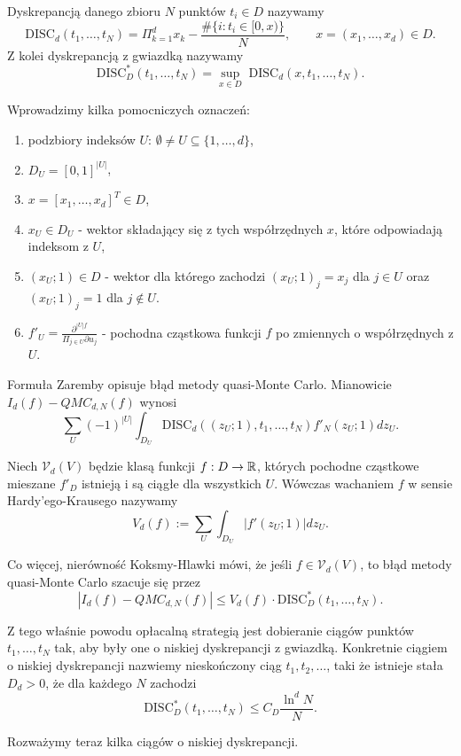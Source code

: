 \documentclass[a4paper,12pt]{article}
\begin{document}
Dyskrepancją danego zbioru $N$ punktów $t_i \in D$ nazywamy
$$
    \text{DISC}_{d}(t_1, \dots, t_N) = \Pi_{k=1}^{d} x_k - \frac{\#\{ i : t_i \in [0, x) \} }{N}, \qquad
    x = (x_1, \dots, x_d) \in D.
$$
Z kolei dyskrepancją z gwiazdką nazywamy
$$
    \text{DISC}^*_{D}(t_1, \dots, t_N) = \sup_{x \in D} \; \text{DISC}_{d}(x, t_1, \dots, t_N).
$$

Wprowadzimy kilka pomocniczych oznaczeń:
\begin{enumerate}
    \item podzbiory indeksów $U$: $\emptyset \neq U \subseteq \{1, \dots, d\}$,
    \item $D_U = [0, 1]^{|U|}$,
    \item $x = [x_1, \dots, x_d]^T \in D$,
    \item $x_U \in D_U$ - wektor składający się z tych współrzędnych $x$, które odpowiadają indeksom z $U$,
    \item $(x_U; 1) \in D$ - wektor dla którego zachodzi $(x_U; 1)_j = x_j$ dla $j \in U$ oraz $(x_U; 1)_j = 1$ dla $j \notin U$.
    \item $f'_U = \frac{\partial^{|U|f}}{\Pi_{j\in U} \partial u_j}$ - pochodna cząstkowa funkcji $f$ po zmiennych o współrzędnych z $U$.
\end{enumerate}

Formuła Zaremby opisuje błąd metody quasi-Monte Carlo. Mianowicie $I_d(f) - QMC_{d, N}(f)$ wynosi
$$
    \sum_{U}(-1)^{|U|} \int_{D_U} \text{DISC}_d((z_U; 1), t_1, \dots, t_N) f'_N(z_U; 1)dz_U.
$$

Niech $\mathcal{V}_d(V)$ będzie klasą funkcji $f : D \to \mathbb{R}$, których pochodne cząstkowe
mieszane $f'_D$ istnieją i są ciągłe dla wszystkich $U$. Wówczas
wachaniem $f$ w sensie Hardy'ego-Krausego nazywamy
$$
    V_d(f) := \sum_{U} \int_{D_U} |f'(z_U;1)|dz_U.
$$

Co więcej, nierówność Koksmy-Hlawki mówi, że jeśli $f \in \mathcal{V}_d(V)$, to
błąd metody quasi-Monte Carlo szacuje się przez
$$
    |I_d(f) - QMC_{d, N}(f)| \leq V_d(f) \cdot \text{DISC}^*_{D}(t_1, \dots, t_N).
$$

Z tego właśnie powodu opłacalną strategią jest dobieranie ciągów punktów $t_1, \dots, t_N$
tak, aby były one o niskiej dyskrepancji z gwiazdką. Konkretnie ciągiem o niskiej
dyskrepancji nazwiemy nieskończony ciąg $t_1, t_2, \dots$, taki że istnieje
stała $D_d > 0$, że dla każdego $N$ zachodzi
$$
    \text{DISC}^*_{D}(t_1, \dots, t_N) \leq C_D \frac{\ln^{d}N}{N}.
$$

Rozważymy teraz kilka ciągów o niskiej dyskrepancji.
\end{document}
